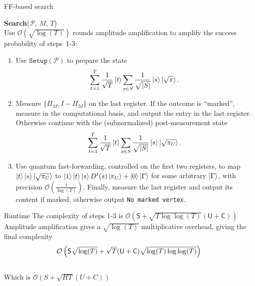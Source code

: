 \documentclass[10pt]{beamer}
\newcommand{\bigO}[1]{\mathcal{O}\left( #1 \right)}
\newcommand{\bigOt}[1]{\widetilde{\mathcal{O}}\left( #1 \right)}
\newcommand{\PM}{\mathcal{P}}
\newcommand{\setup}{\mathtt{Setup}}
\begin{document}
\begin{frame}[shrink]{FF-based search}

\begin{algorithm}[H]
	\textbf{Search}($ \PM $, $ M $, $T$)\\ %
	Use $\bigO{\!\!\sqrt{\log(T)}}\!$ rounds amplitude amplification to amplify the success probability of steps~1-$3$:
	\begin{enumerate}
		\item Use $\setup(\PM)$ to prepare the state $$\sum_{t=1}^{T}\frac{1}{\sqrt{T}}\ket{t}\sum_{s\in S}\frac{1}{\sqrt{|S|}}\ket{s}\ket{\sqrt{\pi}}.$$
		\item Measure $\{\Pi_M,I-\Pi_M\}$ on the last register. If the outcome is ``marked'', measure in the computational basis, and output the entry in the last register. Otherwise continue with the (subnormalized) post-measurement state %
		$$\sum_{t=1}^{T}\frac{1}{\sqrt{T}}\ket{t}\sum_{s\in S}\frac{1}{\sqrt{|S|}}\ket{s}\ket{\sqrt{\pi_U}}.$$
		\item Use quantum fast-forwarding, controlled on the first two registers, to map $\ket{t}\ket{s}\ket{\sqrt{\pi_U}}$ to $\ket{1}\ket{t}\ket{s}D^t(s)\ket{\pi_U}+\ket{0}\ket{\Gamma}$ for some arbitrary $\ket{\Gamma}$, with precision $\bigO{\frac{1}{\log(T)}}$. Finally, measure the last register and output its content if marked, otherwise output \texttt{No marked vertex}.
	\end{enumerate}
	\caption{Fast-forwarding-based search algorithm}\label{alg:alg2}
\end{algorithm}
\end{frame}

\begin{frame}{Runtime}
The complexity of steps 1-3 is
$\bigO{\mathsf{S}+\sqrt{T\log\log(T)}(\mathsf{U}+\mathsf{C})}$
Amplitude amplification gives a $\sqrt{\log(T)}$ multiplicative overhead, giving the final complexity $$\bigO{\mathsf{S}\sqrt{\log(T)}+\sqrt{T}({\sf U}+{\sf C})\sqrt{\log(T)\log\log(T)}}$$
\\
Which is $\bigOt{S + \sqrt{HT}(U+C)}$
\end{frame}

\begin{frame}{}
\nocite{*}



\end{frame}
\end{document}
